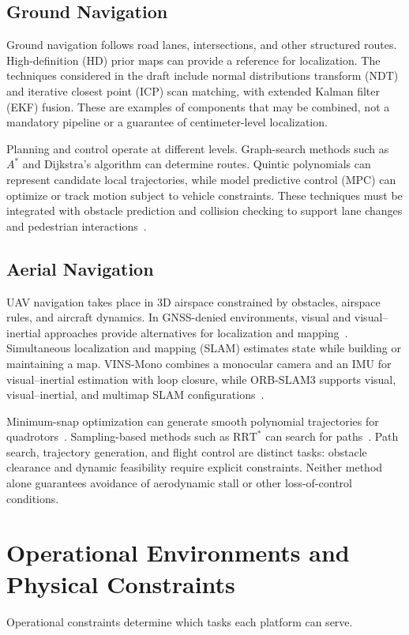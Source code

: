 \documentclass[11pt,a4paper]{article}
\begin{document}
\subsection{Ground Navigation}
Ground navigation follows road lanes, intersections, and other structured routes. High-definition (HD) prior maps can provide a reference for localization. The techniques considered in the draft include normal distributions transform (NDT) and iterative closest point (ICP) scan matching, with extended Kalman filter (EKF) fusion. These are examples of components that may be combined, not a mandatory pipeline or a guarantee of centimeter-level localization.

Planning and control operate at different levels. Graph-search methods such as \(A^*\) and Dijkstra's algorithm can determine routes. Quintic polynomials can represent candidate local trajectories, while model predictive control (MPC) can optimize or track motion subject to vehicle constraints. These techniques must be integrated with obstacle prediction and collision checking to support lane changes and pedestrian interactions~\cite{paden2016}.

\subsection{Aerial Navigation}
UAV navigation takes place in 3D airspace constrained by obstacles, airspace rules, and aircraft dynamics. In GNSS-denied environments, visual and visual--inertial approaches provide alternatives for localization and mapping~\cite{chang2023}. Simultaneous localization and mapping (SLAM) estimates state while building or maintaining a map. VINS-Mono combines a monocular camera and an IMU for visual--inertial estimation with loop closure, while ORB-SLAM3 supports visual, visual--inertial, and multimap SLAM configurations~\cite{vinsmono,orbslam3}.

Minimum-snap optimization can generate smooth polynomial trajectories for quadrotors~\cite{mellinger2011}. Sampling-based methods such as \(\mathrm{RRT}^*\) can search for paths~\cite{karaman2011}. Path search, trajectory generation, and flight control are distinct tasks: obstacle clearance and dynamic feasibility require explicit constraints. Neither method alone guarantees avoidance of aerodynamic stall or other loss-of-control conditions.

\section{Operational Environments and Physical Constraints}
Operational constraints determine which tasks each platform can serve.
\end{document}
